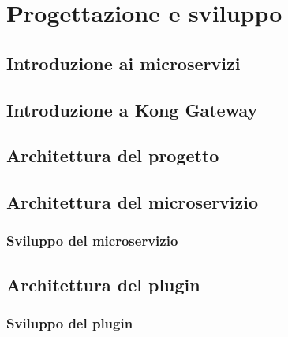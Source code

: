 \chapter{Progettazione e sviluppo}\label{chapter:formattazione}
\section{Introduzione ai microservizi}\label{sec:cap_sec_subsec}
\section{Introduzione a Kong Gateway}\label{sec:cap_sec_subsec}
\section{Architettura del progetto}\label{sec:cap_sec_subsec}
\section{Architettura del microservizio}\label{sec:cap_sec_subsec}
\subsection{Sviluppo del microservizio}\label{sec:cap_sec_subsec}
\section{Architettura del plugin}\label{sec:cap_sec_subsec}
\subsection{Sviluppo del plugin}\label{sec:cap_sec_subsec}

